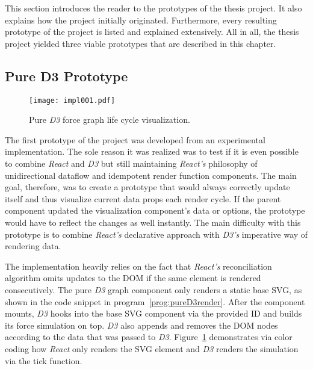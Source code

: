 This section introduces the reader to the prototypes of the thesis project. It also explains how the project initially originated. Furthermore, every resulting prototype of the project is listed and explained extensively. All in all, the thesis project yielded three viable prototypes that are described in this chapter. 


\subsection{Pure D3 Prototype}
\label{sec:pureD3prototype}

\begin{figure}
\centering
\texttt{[image: impl001.pdf]}
\caption{Pure \emph{D3} force graph life cycle visualization.}
\label{fig:pureD3Lifecycle}
\end{figure}

The first prototype of the project was developed from an experimental implementation. The sole reason it was realized was to test if it is even possible to combine \emph{React} and \emph{D3} but still maintaining \emph{React's} philosophy of unidirectional dataflow and idempotent render function components. The main goal, therefore, was to create a prototype that would always correctly update itself and thus visualize current data props each render cycle. If the parent component updated the visualization component's data or options, the prototype would have to reflect the changes as well instantly. The main difficulty with this prototype is to combine \emph{React's} declarative approach with \emph{D3's} imperative way of rendering data.

The implementation heavily relies on the fact that \emph{React's} reconciliation algorithm omits updates to the DOM if the same element is rendered consecutively. The pure \emph{D3} graph component only renders a static base SVG, as shown in the code snippet in program~\ref{prog:pureD3render}. After the component mounts, \emph{D3} hooks into the base SVG component via the provided ID and builds its force simulation on top. \emph{D3} also appends and removes the DOM nodes according to the data that was passed to \emph{D3}. Figure~\ref{fig:pureD3Lifecycle} demonstrates via color coding how \emph{React} only renders the SVG element and \emph{D3} renders the simulation via the tick function.

